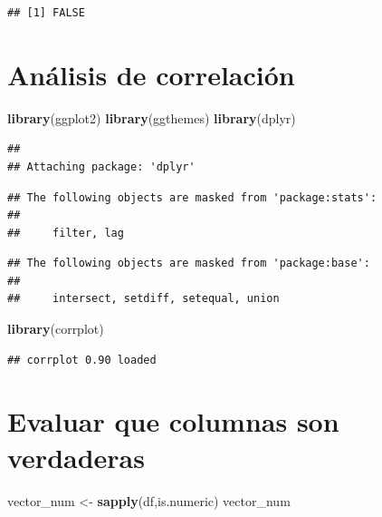 \documentclass[
]{article}
\newenvironment{Shaded}{\begin{snugshade}}{\end{snugshade}}
\newcommand{\KeywordTok}[1]{\textcolor[rgb]{0.13,0.29,0.53}{\textbf{#1}}}
\newcommand{\NormalTok}[1]{#1}
\newcommand{\StringTok}[1]{\textcolor[rgb]{0.31,0.60,0.02}{#1}}
\begin{document}
\begin{verbatim}
## [1] FALSE
\end{verbatim}

\hypertarget{anuxe1lisis-de-correlaciuxf3n}{%
\section{Análisis de correlación}\label{anuxe1lisis-de-correlaciuxf3n}}

\begin{Shaded}
\begin{Highlighting}[]
\KeywordTok{library}\NormalTok{(ggplot2)}
\KeywordTok{library}\NormalTok{(ggthemes)}
\KeywordTok{library}\NormalTok{(dplyr)}
\end{Highlighting}
\end{Shaded}

\begin{verbatim}
## 
## Attaching package: 'dplyr'
\end{verbatim}

\begin{verbatim}
## The following objects are masked from 'package:stats':
## 
##     filter, lag
\end{verbatim}

\begin{verbatim}
## The following objects are masked from 'package:base':
## 
##     intersect, setdiff, setequal, union
\end{verbatim}

\begin{Shaded}
\begin{Highlighting}[]
\KeywordTok{library}\NormalTok{(corrplot)}
\end{Highlighting}
\end{Shaded}

\begin{verbatim}
## corrplot 0.90 loaded
\end{verbatim}

\hypertarget{evaluar-que-columnas-son-verdaderas}{%
\section{Evaluar que columnas son
verdaderas}\label{evaluar-que-columnas-son-verdaderas}}

\begin{Shaded}
\begin{Highlighting}[]
\NormalTok{vector_num <-}\StringTok{ }\KeywordTok{sapply}\NormalTok{(df,is.numeric)}
\NormalTok{vector_num}
\end{Highlighting}
\end{Shaded}
\end{document}
